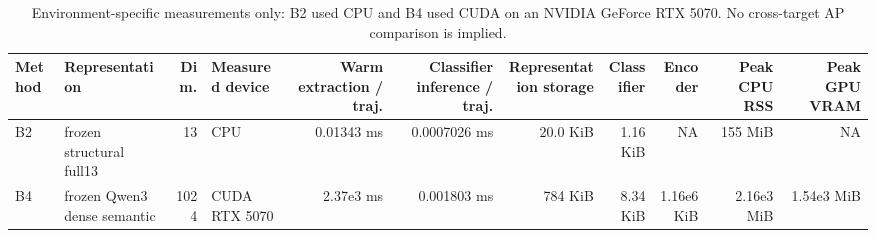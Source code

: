 \begin{table}[t]
\centering
\scriptsize
\caption{Environment-specific measurements only: B2 used CPU and B4 used CUDA on an NVIDIA GeForce RTX 5070. No cross-target AP comparison is implied.}
\label{tab:efficiency-complexity}
\begin{tabular}{lp{}rp{}rrrrrrr}
\hline
Method & Representation & Dim. & Measured device & Warm extraction / traj. & Classifier inference / traj. & Representation storage & Classifier & Encoder & Peak CPU RSS & Peak GPU VRAM \\
\hline
B2 & frozen structural full13 & 13 & CPU & 0.01343 ms & 0.0007026 ms & 20.0 KiB & 1.16 KiB & NA & 155 MiB & NA \\
B4 & frozen Qwen3 dense semantic & 1024 & CUDA RTX 5070 & 2.37e3 ms & 0.001803 ms & 784 KiB & 8.34 KiB & 1.16e6 KiB & 2.16e3 MiB & 1.54e3 MiB \\
\hline
\end{tabular}
\end{table}
